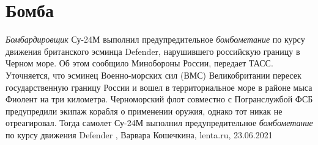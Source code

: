  
 
 
 
 
\chapter{Бомба}
\label{sec:slova.bomba}

\emph{Бомбардировщик} Су-24М выполнил предупредительное \emph{бомбометание} по курсу движения
британского эсминца Defender, нарушившего российскую границу в Черном море. Об
этом сообщило Минобороны России, передает ТАСС.  Уточняется, что эсминец
Военно-морских сил (ВМС) Великобритании пересек государственную границу России
и вошел в территориальное море в районе мыса Фиолент на три километра.
Черноморский флот совместно с Погранслужбой ФСБ предупредили экипаж корабля о
применении оружия, однако тот никак не отреагировал. Тогда самолет Су-24М
выполнил предупредительное \emph{бомбометание} по курсу движения Defender
, 
Варвара Кошечкина, lenta.ru, 23.06.2021
